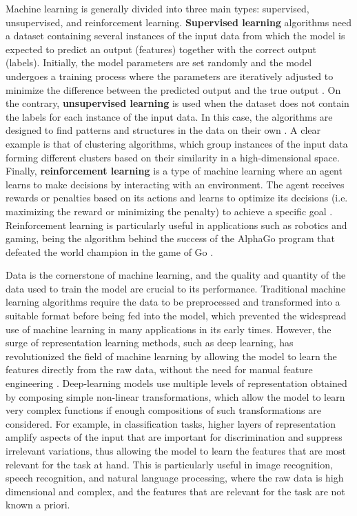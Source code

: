 Machine learning is generally divided into three main types: supervised,
unsupervised, and reinforcement learning. \textbf{Supervised learning}
algorithms need a dataset containing several instances of the input data from
which the model is expected to predict an output (features) together with the
correct output (labels). Initially, the model parameters are set randomly and
the model undergoes a training process where the parameters are iteratively
adjusted to minimize the difference between the predicted output and the true
output \cite{Nielsen2015}. On the contrary, \textbf{unsupervised learning} is
used when the dataset does not contain the labels for each instance of the
input data. In this case, the algorithms are designed to find patterns and
structures in the data on their own \cite{Duda2006}. A clear example is that of
clustering algorithms, which group instances of the input data forming
different clusters based on their similarity in a high-dimensional space.
Finally, \textbf{reinforcement learning} is a type of machine learning where an
agent learns to make decisions by interacting with an environment. The agent
receives rewards or penalties based on its actions and learns to optimize its
decisions (i.e. maximizing the reward or minimizing the penalty) to achieve a
specific goal \cite{Sutton2018}. Reinforcement learning is particularly useful
in applications such as robotics and gaming, being the algorithm behind the
success of the AlphaGo program that defeated the world champion in the game of
Go \cite{Silver2017}.

Data is the cornerstone of machine learning, and the quality and quantity of
the data used to train the model are crucial to its performance. Traditional
machine learning algorithms require the data to be preprocessed and
transformed into a suitable format before being fed into the model, which
prevented the widespread use of machine learning in many applications in its
early times. However, the surge of representation learning methods, such as
deep learning, has revolutionized the field of machine learning by allowing the
model to learn the features directly from the raw data, without the need for
manual feature engineering \cite{LeCun2015}. Deep-learning models use multiple
levels of representation obtained by composing simple non-linear
transformations, which allow the model to learn very complex functions if
enough compositions of such transformations are considered. For example, in
classification tasks, higher layers of representation amplify aspects of the
input that are important for discrimination and suppress irrelevant variations,
thus allowing the model to learn the features that are most relevant for the
task at hand. This is particularly useful in image recognition, speech
recognition, and natural language processing, where the raw data is high
dimensional and complex, and the features that are relevant for the task are
not known a priori.


